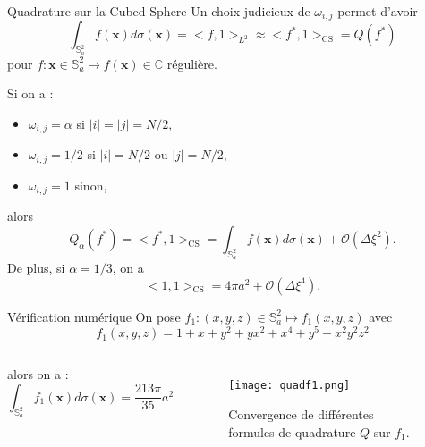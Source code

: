 \documentclass[11pt]{beamer}
\def\CS{\text{CS}}
\def\gint{\displaystyle\int}
\begin{document}
\begin{frame}{Quadrature sur la Cubed-Sphere}
Un choix judicieux de $\omega_{i,j}$ permet d'avoir
$$
\gint_{\mathbb{S}_a^2} f(\mathbf{x}) d \sigma(\mathbf{x}) = <f, 1>_{L^2} \approx <f^*, \mathfrak{1}>_{\CS} = Q(f^*)
$$
pour $f : \mathbf{x} \in \mathbb{S}_a^2 \mapsto f(\mathbf{x}) \in \mathbb{C}$ régulière. 

\begin{block}{}
Si on a :
\begin{itemize}
\item $\omega_{i,j} = \alpha$ si $|i| = |j| = N/2$,
\item $\omega_{i,j} = 1/2$ si $|i| = N/2$ ou $|j| = N/2$,
\item $\omega_{i,j} = 1$ sinon,
\end{itemize}
alors
$$
 Q_{\alpha}(f^*) =  <f^*, \mathfrak{1}>_{\CS} = \gint_{\mathbb{S}_a^2} f(\mathbf{x}) d \sigma(\mathbf{x}) + \mathcal{O} \left( \Delta \xi^2 \right).
$$
De plus, si $\alpha = 1/3$, on a
$$
<\mathfrak{1}, \mathfrak{1}>_{\CS} = 4 \pi a^2 + \mathcal{O} \left( \Delta \xi^4 \right).
$$ 
\end{block}
\end{frame}





\begin{frame}{Vérification numérique}
On pose $f_1 : (x,y,z) \in \mathbb{S}_a^2 \mapsto
f_1(x,y,z)$ avec
$$
f_1(x,y,z) = 1+x+y^2 + yx^2 + x^4 + y^5 + x^2 y^2 z^2
$$
\begin{columns}
alors on a :
$$
\gint_{\mathbb{S}_a^2}f_1(\mathbf{x}) d \sigma(\mathbf{x}) = \dfrac{213 \pi}{35} a^2
$$

\begin{figure}
\begin{center}
\texttt{[image: quadf1.png]}
\caption{Convergence de différentes formules de quadrature $Q$ sur $f_1$.}
\end{center}
\end{figure}
\end{columns}
\end{frame}
\end{document}
